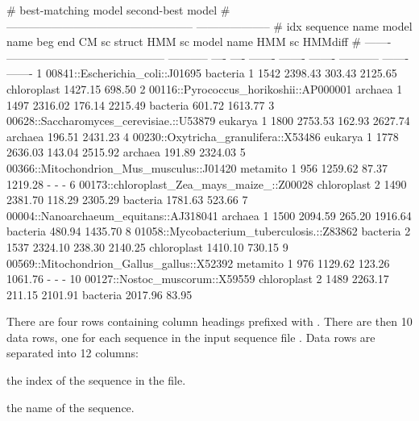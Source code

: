 \begin{sreoutputtinywide}
#                                                                     best-matching model                   second-best model  
#                                                      --------------------------------------------------  --------------------
#     idx  sequence name                               model name    beg   end    CM sc   struct   HMM sc  model name    HMM sc  HMMdiff
# -------  ------------------------------------------  -----------  ----  ----  -------  -------  -------  -----------  -------  -------
        1  00841::Escherichia_coli::J01695             bacteria        1  1542  2398.43   303.43  2125.65  chloroplast  1427.15   698.50
        2  00116::Pyrococcus_horikoshii::AP000001      archaea         1  1497  2316.02   176.14  2215.49  bacteria      601.72  1613.77
        3  00628::Saccharomyces_cerevisiae.::U53879    eukarya         1  1800  2753.53   162.93  2627.74  archaea       196.51  2431.23
        4  00230::Oxytricha_granulifera::X53486        eukarya         1  1778  2636.03   143.04  2515.92  archaea       191.89  2324.03
        5  00366::Mitochondrion_Mus_musculus::J01420   metamito        1   956  1259.62    87.37  1219.28  -                  -        -
        6  00173::chloroplast_Zea_mays_maize_::Z00028  chloroplast     2  1490  2381.70   118.29  2305.29  bacteria     1781.63   523.66
        7  00004::Nanoarchaeum_equitans::AJ318041      archaea         1  1500  2094.59   265.20  1916.64  bacteria      480.94  1435.70
        8  01058::Mycobacterium_tuberculosis.::Z83862  bacteria        2  1537  2324.10   238.30  2140.25  chloroplast  1410.10   730.15
        9  00569::Mitochondrion_Gallus_gallus::X52392  metamito        1   976  1129.62   123.26  1061.76  -                  -        -
       10  00127::Nostoc_muscorum::X59559              chloroplast     2  1489  2263.17   211.15  2101.91  bacteria     2017.96    83.95
\end{sreoutputtinywide}

There are four rows containing column headings prefixed with
\prog{\#}. There are then 10 data rows, one for each sequence in the
input sequence file . Data rows are
separated into 12 columns:

\begin{wideitem}
\item[\emprog{idx}] the index of the sequence in the file.

\item[\emprog{sequence name}] the name of the sequence.
\end{wideitem}

